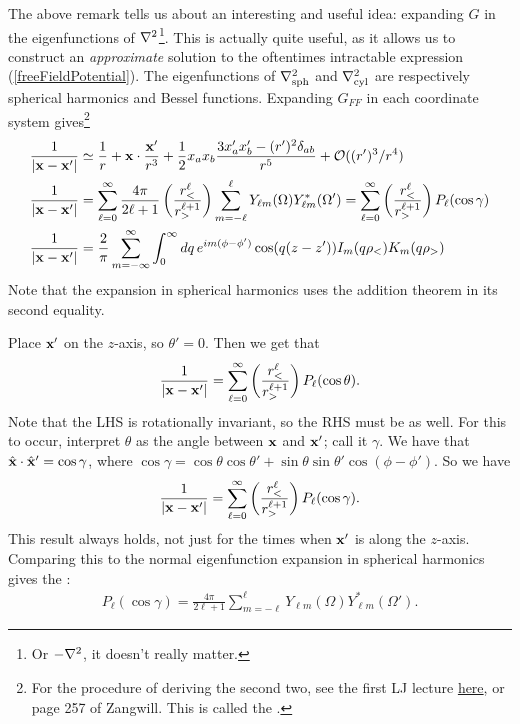 \documentclass[11pt]{article}
\begin{document}
The above remark tells us about an interesting and useful idea:
expanding $G$ in the eigenfunctions of $\nabla^2$\footnote{Or
$- \nabla^2$, it doesn't really matter.}. This is
actually quite useful, as it allows us to construct an \emph{approximate} solution
to the oftentimes intractable expression (\ref{freeFieldPotential}).
The eigenfunctions of $\nabla_{\rm sph}^2$ and $\nabla_{\rm cyl}^2$
are respectively spherical harmonics and Bessel functions.
Expanding $G_{FF}$ in each coordinate system gives\footnote{For
the procedure of deriving the second two, see the first LJ lecture
\href{https://bohr.physics.berkeley.edu/classes/209/f02/lectures/Lecture.9.04.02.pdf}{here}, or page 257 of Zangwill.
This is called the .}
\begin{align*}
    \frac{1}{|\mathbf{x} - \mathbf{x}'|} & \simeq \frac{1}{r} + \mathbf{x} \cdot \frac{\mathbf{x}'}{r^3} + \frac{1}{2} x_a x_b \frac{3 x_a' x_b' - (r')^2 \delta_{ab}}{r^5} + \mathcal{O}((r')^3/r^4)\\
    \frac{1}{|\mathbf{x} - \mathbf{x}'|} & = \sum_{\ell = 0}^\infty \frac{4\pi}{2\ell + 1} \left( \frac{r_<^\ell}{r_>^{\ell + 1}} \right) \sum_{m = -\ell}^\ell Y_{\ell m}(\Omega) Y_{\ell m}^*(\Omega')
    = \sum_{\ell = 0}^\infty \left(  \frac{r_<^\ell}{r_>^{\ell + 1}} \right) P_\ell(\cos{\gamma})\\
    \frac{1}{|\mathbf{x} - \mathbf{x}'|} & = \frac{2}{\pi} \sum_{m = - \infty}^\infty
    \int_0^\infty dq \, e^{im(\phi - \phi')} \cos(q(z - z')) I_m(q\rho_<) K_m(q\rho_>)
\end{align*}
Note that the expansion in spherical harmonics uses the
addition theorem in its second equality.

\begin{iidea}
    Place $\mathbf{x}'$ on the $z$-axis, so $\theta' = 0$. Then
    we get that
    \begin{align*}
        \frac{1}{|\mathbf{x} - \mathbf{x}'|} = \sum_{\ell = 0}^\infty \left( \frac{r_<^\ell}{r_>^{\ell + 1}} \right) P_\ell(\cos{\theta}).
    \end{align*}
    Note that the LHS is rotationally invariant, so the RHS must be as well.
    For this to occur, interpret $\theta$ as the angle between $\mathbf{x}$ and $\mathbf{x}'$;
    call it $\gamma$. We have that $\hat{\mathbf{x}} \cdot \hat{\mathbf{x}}' = \cos{\gamma}$,
    where $\cos{\gamma} = \cos{\theta} \cos{\theta'} + \sin{\theta} \sin{\theta'} \cos(\phi - \phi')$.
    So we have
    \begin{align*}
        \frac{1}{|\mathbf{x} - \mathbf{x}'|} = \sum_{\ell = 0}^\infty \left( \frac{r_<^\ell}{r_>^{\ell + 1}} \right) P_\ell(\cos{\gamma}).
    \end{align*}
    This result always holds, not just for the times when $\mathbf{x}'$ is along the
    $z$-axis. Comparing this to the normal eigenfunction expansion in spherical
    harmonics gives the :
    \begin{align*}
        \boxed{P_\ell(\cos{\gamma}) = \frac{4\pi}{2\ell + 1} \sum_{m = - \ell}^\ell Y_{\ell m}(\Omega) Y_{\ell m}^*(\Omega').}
    \end{align*}
\end{iidea}
\end{document}

